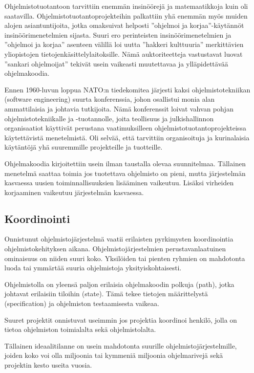 \documentclass[finnish]{tktltiki2}
\theoremstyle{definition}
\theoremstyle{remark}
\begin{document}
Ohjelmistotuotantoon tarvittiin enemmän insinöörejä ja matemaatikkoja kuin oli saatavilla. Ohjelmistotuotantoprojekteihin palkattiin yhä enemmän myös muiden alojen asiantuntijoita, jotka omaksuivat helposti ''ohjelmoi ja korjaa''-käytännöt insinöörimenetelmien sijasta. Suuri ero perinteisten insinöörimenetelmien ja ''ohjelmoi ja korjaa'' asenteen välillä loi uutta ''hakkeri kulttuuria'' merkittävien yliopistojen tietojenkäsittelylaitoksille. Nämä auktoriteetteja vastustavat luovat ''sankari ohjelmoijat'' tekivät usein vaikeasti muutettavaa ja ylläpidettävää ohjelmakoodia\cite{BOE06}.

Ennen 1960-luvun loppua NATO:n tiedekomitea järjesti kaksi ohjelmistotekniikan (software engineering) suurta konferenssia, johon osallistui monia alan ammattilaisia ja johtavia tutkijoita. Nämä konferenssit loivat vahvan pohjan ohjelmistotekniikalle ja -tuotannolle, joita teollisuus ja julkishallinnon organisaatiot käyttivät perustana vaatimuksilleen ohjelmistotuotantoprojekteissa käytettävistä menetelmistä. Oli selvää, että tarvit\-tiin organisoituja ja kurinalaisia käytäntöjä yhä suuremmille projekteille ja tuotteille\cite{BOE06}.

Ohjelmakoodia kirjoitettiin usein ilman taustalla olevaa suunnitelmaa. Tällainen menetelmä saattaa toimia jos tuotettava ohjelmisto on pieni, mutta järjestelmän kasvaessa uusien toiminnallisuuksien lisääminen vaikeutuu. Lisäksi virheiden korjaaminen vaikeutuu järjestelmän kasvaessa\cite{FOW01a}.

\subsection{Koordinointi}

Onnistunut ohjelmistojärjestelmä vaatii erilaisten pyrkimysten koordinointia ohjelmistokehityksen aikana. Ohjelmistojärjestelmien perustavanlaatuinen ominaisuus on niiden suuri koko. Yksilöiden tai pienten ryhmien on mahdotonta luoda tai ymmärtää suuria ohjelmistoja yksityiskohtaisesti\cite{KES95}.

Ohjelmistolla on yleensä paljon erilaisia ohjelmakoodin polkuja (path), jotka johtavat erilaisiin tiloihin (state). Tämä tekee tietojen määrittelystä (specification) ja ohjelmiston testaamisesta vaikeaa\cite{BOE06}.

Suuret projektit onnistuvat useimmin jos projektia koordinoi henkilö, jolla on tietoa ohjelmiston toimialalta sekä ohjelmistolalta\cite{KES95}.

Tällainen ideaalitilanne on usein mahdotonta suurille ohjelmistojärjestelmille, joiden koko voi olla miljoonia tai kymmeniä miljoonia ohjelmarivejä sekä projektin kesto useita vuosia\cite{KES95}.
\end{document}
